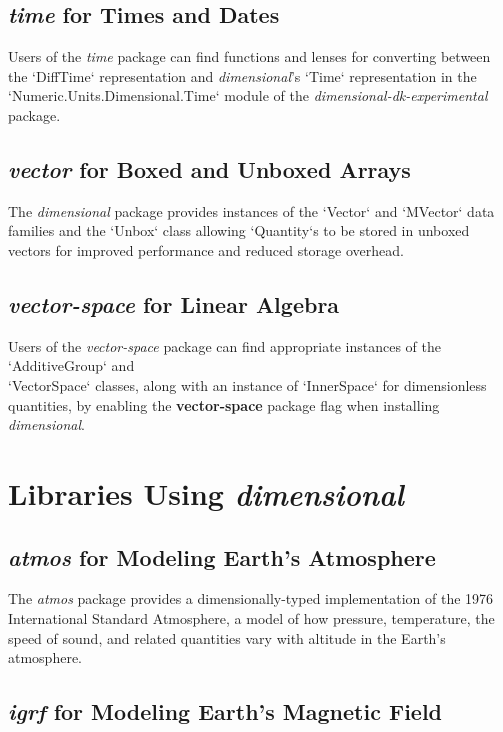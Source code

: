 \documentclass[11pt]{report}
\newcommand{\packagename}[1]{\textit{#1}}
\newcommand{\thispackage}{\packagename{dimensional}}
\newcommand{\experimentalpackage}{\packagename{dimensional-dk-experimental}}
\newcommand{\flag}[1]{\textbf{#1}}
\begin{document}
\section{\packagename{time} for Times and Dates}

Users of the \packagename{time} package can find functions and lenses for converting
between the `DiffTime` representation and \thispackage{}'s `Time` representation in the
`Numeric.Units.Dimensional.Time` module of the \experimentalpackage{} package.

\section{\packagename{vector} for Boxed and Unboxed Arrays}

The \thispackage{} package provides instances of the `Vector` and `MVector` data families and the `Unbox` class
allowing `Quantity`s to be stored in unboxed vectors for improved performance and reduced storage overhead.

\section{\packagename{vector-space} for Linear Algebra}

Users of the \packagename{vector-space} package can find appropriate instances of the `AdditiveGroup` and \\
`VectorSpace` classes, along with an instance of `InnerSpace` for dimensionless quantities, by enabling the \flag{vector-space}
package flag when installing \thispackage{}.

\chapter{Libraries Using \thispackage}

\section{\packagename{atmos} for Modeling Earth's Atmosphere}

The \packagename{atmos} package provides a dimensionally-typed implementation of the 1976 International Standard
Atmosphere, a model of how pressure, temperature, the speed of sound, and related quantities vary with
altitude in the Earth's atmosphere.

\section{\packagename{igrf} for Modeling Earth's Magnetic Field}
\end{document}
